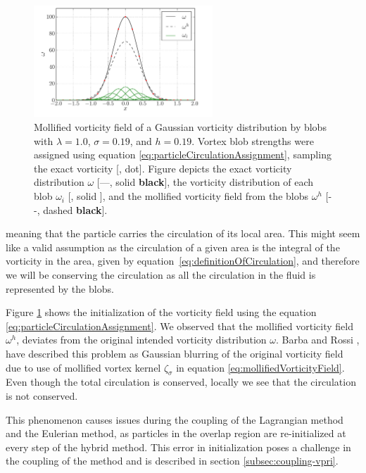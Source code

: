 	\begin{figure}[!t]
	\centering
	\includegraphics[width=0.6\textwidth]{figures/lagrangian/particleInitialization.pdf}
	\caption{Mollified vorticity field of a Gaussian vorticity distribution by blobs with $\lambda=1.0$, $\sigma=0.19$, and $h=0.19$. Vortex blob strengths were assigned using equation \ref{eq:particleCirculationAssignment}, sampling the exact vorticity [{\color{plotRed}{$\bullet$}}, {} dot]. Figure depicts the exact vorticity distribution $\omega$ [---, solid \textbf{black}], the vorticity distribution of each blob $\omega_i$ [{\color{darkgreen}{---}}, solid {}], and the mollified vorticity field from the blobs $\omega^h$ [- -, dashed \textbf{black}].  }
	\label{fig:particleInitialization}
	\end{figure}

meaning that the particle carries the circulation of its local area. This might seem like a valid assumption as the circulation of a given area is the integral of the vorticity in the area, given by equation\ \ref{eq:definitionOfCirculation}, and therefore we will be conserving the circulation as all the circulation in the fluid is represented by the blobs.

Figure \ref{fig:particleInitialization} shows the initialization of the vorticity field using the equation 	\ref{eq:particleCirculationAssignment}. We observed that the mollified vorticity field $\omega^h$, deviates from the original intended vorticity distribution $\omega$. Barba and Rossi \cite{Barba2010a}, have described this problem as Gaussian blurring of the original vorticity field due to use of mollified vortex kernel $\zeta_{\sigma}$ in equation 	\ref{eq:mollifiedVorticityField}. Even though the total circulation is conserved, locally we see that the circulation is not conserved. 

This phenomenon causes issues during the coupling of the Lagrangian method and the Eulerian method, as particles in the overlap region are re-initialized at every step of the hybrid method. This error in initialization poses a challenge in the coupling of the method and is described in section \ref{subsec:coupling-vpri}.

